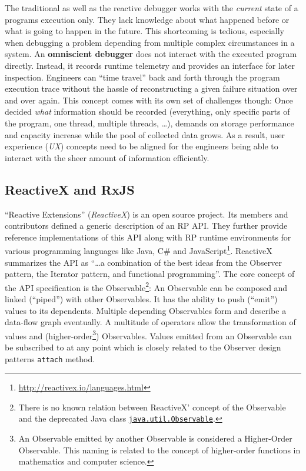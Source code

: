 \documentclass[12pt,a4paper]{article}
\begin{document}
The traditional as well as the reactive debugger works with the \emph{current} state of a programs execution only. They lack knowledge about what happened before or what is going to happen in the future. This shortcoming is tedious, especially when debugging a problem depending from multiple complex circumstances in a system. An \textbf{omniscient debugger} \cite{5287015} \cite{DBLP:journals/corr/OCallahanJFHNP17} does not interact with the executed program directly. Instead, it records runtime telemetry and provides an interface for later inspection. Engineers can ``time travel'' back and forth through the program execution trace without the hassle of reconstructing a given failure situation over and over again. This concept comes with its own set of challenges though: Once decided \emph{what} information should be recorded (everything, only specific parts of the program, one thread, multiple threads, \dots), demands on storage performance and capacity increase while the pool of collected data grows. As a result, user experience (\emph{UX}) concepts need to be aligned for the engineers being able to interact with the sheer amount\cite{5287015} of information efficiently.

\subsection{ReactiveX and RxJS}

``Reactive Extensions'' (\emph{ReactiveX}) is an open source project. Its members and contributors defined a generic description of an RP API. They further provide reference implementations of this API along with RP runtime environments for various programming languages like Java, C\# and JavaScript\footnote{\url{http://reactivex.io/languages.html}}. ReactiveX summarizes the API as ``\dots a combination of the best ideas from the Observer pattern, the Iterator pattern, and functional programming''\cite{reactivex}. The core concept of the API specification is the Observable\footnote{There is no known relation between ReactiveX' concept of the Observable and the deprecated Java class \href{https://docs.oracle.com/en/java/javase/11/docs/api/java.base/java/util/Observable.html}{\texttt{java.util.Observable}}.}: An Observable can be composed and linked (``piped'') with other Observables. It has the ability to push (``emit'') values to its dependents. Multiple depending Observables form and describe a data-flow graph eventually. A multitude of operators allow the transformation of values and (higher-order\footnote{An Observable emitted by another Observable is considered a Higher-Order Observable. This naming is related to the concept of higher-order functions in mathematics and computer science.}) Observables. Values emitted from an Observable can be subscribed to at any point which is closely related to the Observer design patterns \texttt{attach} method.
\end{document}
